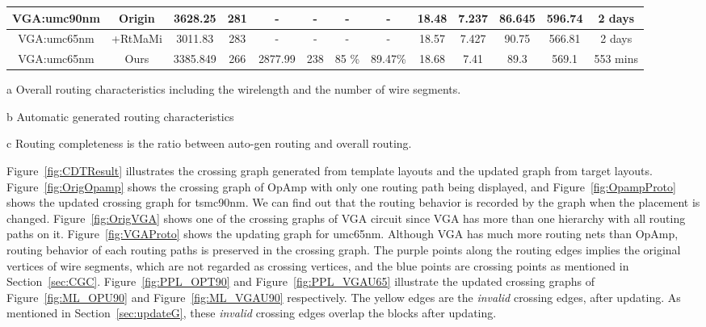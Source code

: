 \begin{table}
\begin{threeparttable}
\begin{center}
\begin{tabular}{|c|c|c|c|c|c|c|c|c|c|c|c|c|}
          VGA:umc90nm & Origin &  3628.25  &  281& -&-&- & - & 18.48 & 7.237&86.645 & 596.74 & 2 days \\
          \hline
          VGA:umc65nm & \cite{msc-bhattacharya-tcad06}+RtMaMi &  3011.83& 283 & -& - &- & - & 18.57 & 7.427 &90.75& 566.81&   2 days \\
          \hline
          VGA:umc65nm & Ours & 3385.849& 266 &  2877.99& 238 & 85 \% & 89.47\%&18.68 & 7.41& 89.3 & 569.1& 553 mins  \\
          \hline
        \end{tabular}
        \begin{tablenotes}
          \item [a] Overall routing characteristics including the wirelength and the number of wire segments. 
          \item [b] Automatic generated routing characteristics
          \item [c] Routing completeness is the ratio between auto-gen routing and overall routing. 
        \end{tablenotes}
        \end{center}
        \end{threeparttable}
      \end{table} 
         

      Figure~\ref{fig:CDTResult} illustrates the crossing graph generated from template layouts and the updated graph from target layouts. Figure~\ref{fig:OrigOpamp} shows the crossing graph of OpAmp with only one routing path being displayed, and Figure~\ref{fig:OpampProto} shows the updated crossing graph for tsmc90nm. We can find out that the routing behavior is recorded by the graph when the placement is changed. Figure~\ref{fig:OrigVGA} shows one of the crossing graphs of VGA circuit since VGA has more than one hierarchy with all routing paths on it. Figure~\ref{fig:VGAProto} shows the updating graph for umc65nm. Although VGA has much more routing nets than OpAmp, routing behavior of each routing paths is preserved in the crossing graph. The purple points along the routing edges implies the original vertices of wire segments, which are not regarded as crossing vertices, and the blue points are crossing points as mentioned in Section~\ref{sec:CGC}. Figure~\ref{fig:PPL_OPT90} and Figure~\ref{fig:PPL_VGAU65} illustrate the updated crossing graphs of Figure~\ref{fig:ML_OPU90} and Figure~\ref{fig:ML_VGAU90} respectively. The yellow edges are the {\it invalid} crossing edges, after updating. As mentioned in Section~\ref{sec:updateG}, these {\it invalid} crossing edges overlap the blocks after updating.

